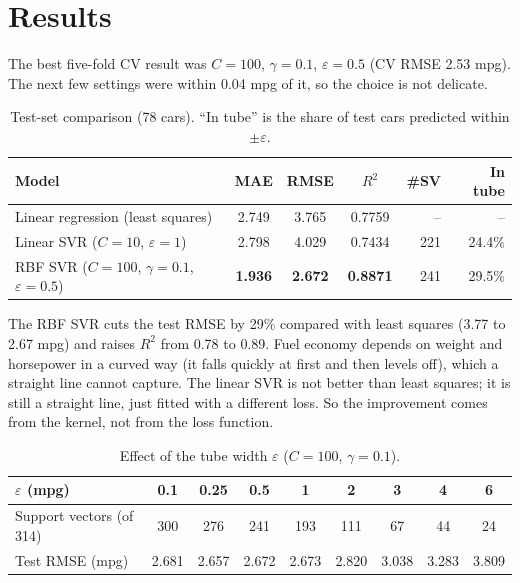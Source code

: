\section{Results}

The best five-fold CV result was $C=100$, $\gamma=0.1$, $\varepsilon=0.5$ (CV RMSE 2.53 mpg). The next
few settings were within 0.04 mpg of it, so the choice is not delicate.

\begin{table}[H]
\centering\small
\caption{Test-set comparison (78 cars). ``In tube'' is the share of test cars predicted within $\pm\varepsilon$.}
\label{tab:svr-test}
\begin{tabular}{@{}l S[table-format=1.3] S[table-format=1.3] S[table-format=1.4] r r@{}}
\toprule
\textbf{Model} & {\textbf{MAE}} & {\textbf{RMSE}} & {\textbf{$R^2$}} & \textbf{\#SV} & \textbf{In tube}\\
\midrule
Linear regression (least squares)          & 2.749 & 3.765 & 0.7759 & -- & --\\
Linear SVR ($C=10$, $\varepsilon=1$)       & 2.798 & 4.029 & 0.7434 & 221 & 24.4\%\\
RBF SVR ($C=100$, $\gamma=0.1$, $\varepsilon=0.5$) & \bfseries 1.936 & \bfseries 2.672 & \bfseries 0.8871 & 241 & 29.5\%\\
\bottomrule
\end{tabular}
\end{table}

The RBF SVR cuts the test RMSE by 29\% compared with least squares (3.77 to 2.67 mpg) and raises $R^2$
from 0.78 to 0.89. Fuel economy depends on weight and horsepower in a curved way (it falls quickly at
first and then levels off), which a straight line cannot capture. The linear SVR is not better than least
squares; it is still a straight line, just fitted with a different loss. So the improvement comes from
the kernel, not from the loss function.

\begin{table}[H]
\centering\small
\caption{Effect of the tube width $\varepsilon$ ($C=100$, $\gamma=0.1$).}
\label{tab:svr-eps}
\begin{tabular}{@{}l c c c c c c c c@{}}
\toprule
$\varepsilon$ (mpg) & 0.1 & 0.25 & 0.5 & 1 & 2 & 3 & 4 & 6\\
\midrule
Support vectors (of 314) & 300 & 276 & 241 & 193 & 111 & 67 & 44 & 24\\
Test RMSE (mpg) & 2.681 & 2.657 & 2.672 & 2.673 & 2.820 & 3.038 & 3.283 & 3.809\\
\bottomrule
\end{tabular}
\end{table}

